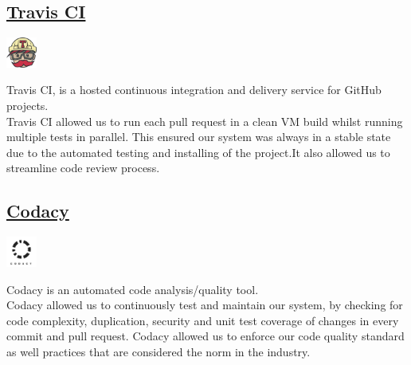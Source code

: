 \documentclass{article}
\begin{document}
		\begin{minipage}[b]{0.20\linewidth}
			\subsection{\href{https://travis-ci.org} {Travis CI}}
		\vspace{2mm}
		\end{minipage}
		\begin{minipage}[b]{0.80\linewidth}
			\includegraphics[width=1.0cm]{img/travis.jpg}
		\end{minipage}
		Travis CI, is a hosted continuous integration and delivery service for GitHub projects.\\	

		\noindent
		Travis CI allowed us to run each pull request in a clean VM build whilst running multiple tests in parallel.
		This ensured our system was always in a stable state due to the automated testing and installing of the				        project.It also allowed us to streamline code review process.\\

		\begin{minipage}[b]{0.20\linewidth}
			\subsection{\href{https://www.codacy.com}{Codacy}}
		\vspace{2mm}
		\end{minipage}
		\begin{minipage}[b]{0.80\linewidth}
			\includegraphics[width=1.0cm]{img/codacy.png}
		\end{minipage}
		Codacy is an automated code analysis/quality tool.\\
		
		\noindent
		Codacy allowed us to continuously test and maintain our system, by checking for code complexity,
		duplication, security and unit test coverage of changes in every commit and pull request.
		Codacy allowed us to enforce our code quality standard as well practices
		that are considered the norm in the industry.
		
\end{document}
